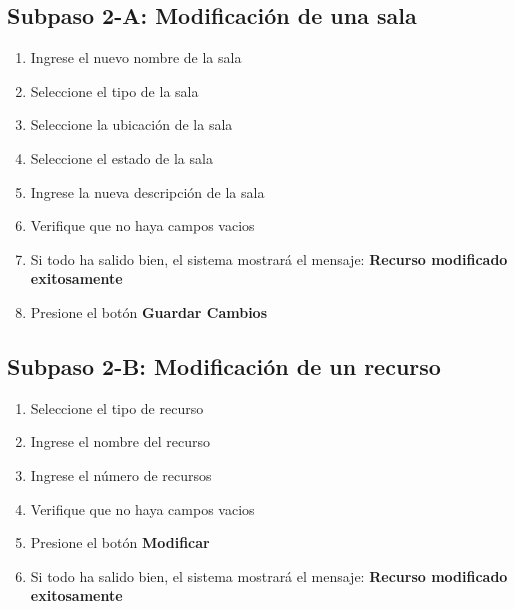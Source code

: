 \subsection{Subpaso 2-A: Modificación de una sala}
\begin{enumerate}
	\item Ingrese el nuevo nombre de la sala
	\item Seleccione el tipo de la sala
	\item Seleccione la ubicación de la sala
	\item Seleccione el estado de la sala
	\item Ingrese la nueva descripción de la sala
	\item Verifique que no haya campos vacios
	\item Si todo ha salido bien, el sistema mostrará el mensaje: \textbf{Recurso modificado exitosamente}
	\item Presione el botón \textbf{Guardar Cambios}
\end{enumerate}

\subsection{Subpaso 2-B: Modificación de un recurso}
\begin{enumerate}
	\item Seleccione el tipo de recurso
	\item Ingrese el nombre del recurso
	\item Ingrese el número de recursos 
	\item Verifique que no haya campos vacios
	\item Presione el botón \textbf{Modificar}
	\item Si todo ha salido bien, el sistema mostrará el mensaje: \textbf{Recurso modificado exitosamente}
\end{enumerate}
